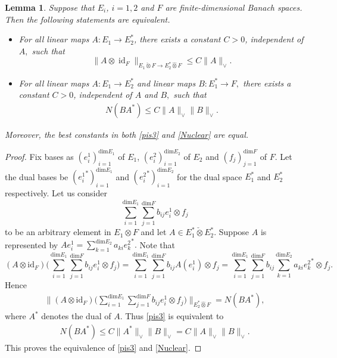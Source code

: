 \documentclass[a4paper,oneside,11pt, reqno]{amsart}
\numberwithin{equation}{section}
\newtheorem{lemma}[theorem]{Lemma}
\newtheorem{corollary}[theorem]{Corollary}
\theoremstyle{plain}
\begin{document}
\begin{lemma}\label{Pisier-Nuclear}
Suppose that $E_i$, $i=1,2$ and $F$ are finite-dimensional Banach spaces. Then the following statements are equivalent.
\begin{itemize}
\item[1.] For all linear maps $A:E_1\to E_2^*$, there exists a constant $C>0$, independent of $A,$ such that
\begin{equation}\label{pis3}
\|A\otimes \operatorname{id}_{F}\|_{E_1\check{\otimes}F\to E_2^*\hat{\otimes}F}\leqslant C \|A\|_{\vee}.
\end{equation}
\item[2.] For all linear maps $A:E_1\to E_2^*$ and linear maps $B:E_1^*\to F,$ there exists a constant $C>0$, independent of $A$ and $B,$ such that 
\begin{eqnarray}\label{Nuclear}
N(BA^*)\leqslant C\|A\|_{\vee}\|B\|_{\vee}.
\end{eqnarray}
\end{itemize}
{\textit{Moreover, the best constants in both \eqref{pis3} and \eqref{Nuclear} are equal.}}
\end{lemma}
\begin{proof}
Fix bases as $(e_i^1)_{i=1}^{\text{dim}E_1}$ of $E_1$, $(e_i^2)_{i=1}^{\text{dim}E_2}$ of $E_2$ and $(f_j)_{j=1}^{\text{dim}F}$ of $F.$ Let the dual bases be $({e_i^1}^*)_{i=1}^{\text{dim}E_1}$ and $({e_i^2}^*)_{i=1}^{\text{dim}E_2}$ for the dual space $E_1^*$ and $E_2^*$ respectively.
Let us consider \[\sum_{i=1}^{\text{dim}E_1}\sum_{j=1}^{\text{dim}F}b_{ij}e_i^1\otimes f_j \] to be an arbitrary element in $E_1\otimes F$  and let $A\in E_1^*\check{\otimes} E_2^*.$ Suppose $A$ is represented by $Ae_i^1=\sum_{k=1}^{\text{dim}E_2}a_{ki}{e_{k}^2}^*.$ Note that 
\[(A\otimes \text{id}_{F})\Big(\sum_{i=1}^{\text{dim}E_1}\sum_{j=1}^{\text{dim}F}b_{ij}e_i^1\otimes f_j \Big)=\sum_{i=1}^{\text{dim}E_1}\sum_{j=1}^{\text{dim}F}b_{ij}A(e_i^1)\otimes f_j=\sum_{i=1}^{\text{dim}E_1}\sum_{j=1}^{\text{dim}F} b_{ij}\sum_{k=1}^{\text{dim}E_2}a_{ki}{e_
{k}^2}^*\otimes f_j.\]
Hence
\begin{eqnarray*}
\Big\|(A\otimes \text{id}_{F})\Big(\sum_{i=1}^{\text{dim}E_1}\sum_{j=1}^{\text{dim}F}b_{ij}e_i^1\otimes f_j\Big)\Big\|_{E_2^*\hat{\otimes}F}= N(BA^*),
\end{eqnarray*}
where $A^*$ denotes the dual of $A$. Thus \eqref{pis3} is equivalent to 
\begin{eqnarray*}
N(BA^*)\leqslant C \|A^*\|_\vee \|B\|_\vee= C \|A\|_\vee \|B\|_\vee. 
\end{eqnarray*}
This proves the equivalence of \eqref{pis3} and \eqref{Nuclear}.
\end{proof}
\end{document}

